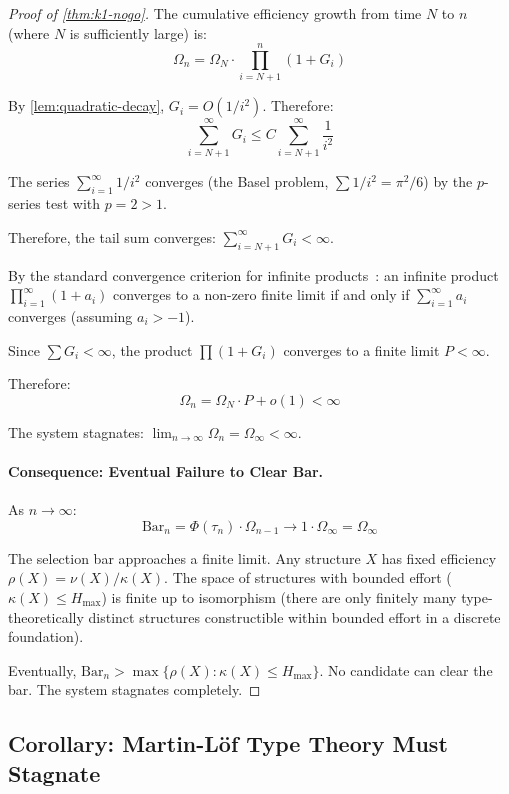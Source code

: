 \documentclass[11pt]{article}
\theoremstyle{definition}
\theoremstyle{remark}
\begin{document}
\begin{proof}[Proof of \cref{thm:k1-nogo}]
The cumulative efficiency growth from time $N$ to $n$ (where $N$ is sufficiently large) is:
\[
\Omega_n = \Omega_N \cdot \prod_{i=N+1}^{n} (1 + G_i)
\]

By \cref{lem:quadratic-decay}, $G_i = O(1/i^2)$. Therefore:
\[
\sum_{i=N+1}^{\infty} G_i \leq C \sum_{i=N+1}^{\infty} \frac{1}{i^2}
\]

The series $\sum_{i=1}^{\infty} 1/i^2$ converges (the Basel problem, $\sum 1/i^2 = \pi^2/6$) by the $p$-series test with $p = 2 > 1$.

Therefore, the tail sum converges: $\sum_{i=N+1}^{\infty} G_i < \infty$.

By the standard convergence criterion for infinite products~\cite{knopp1990theory}: an infinite product $\prod_{i=1}^{\infty} (1 + a_i)$ converges to a non-zero finite limit if and only if $\sum_{i=1}^{\infty} a_i$ converges (assuming $a_i > -1$).

Since $\sum G_i < \infty$, the product $\prod (1 + G_i)$ converges to a finite limit $P < \infty$.

Therefore:
\[
\Omega_n = \Omega_N \cdot P + o(1) < \infty
\]

The system stagnates: $\lim_{n \to \infty} \Omega_n = \Omega_{\infty} < \infty$.

\paragraph{Consequence: Eventual Failure to Clear Bar.}
As $n \to \infty$:
\[
\mathrm{Bar}_n = \Phi(\tau_n) \cdot \Omega_{n-1} \to 1 \cdot \Omega_{\infty} = \Omega_{\infty}
\]

The selection bar approaches a finite limit. Any structure $X$ has fixed efficiency $\rho(X) = \nu(X)/\kappa(X)$. The space of structures with bounded effort ($\kappa(X) \leq H_{\max}$) is finite up to isomorphism (there are only finitely many type-theoretically distinct structures constructible within bounded effort in a discrete foundation).

Eventually, $\mathrm{Bar}_n > \max\{\rho(X) : \kappa(X) \leq H_{\max}\}$. No candidate can clear the bar. The system stagnates completely.
\end{proof}

\subsection{Corollary: Martin-Löf Type Theory Must Stagnate}
\end{document}
